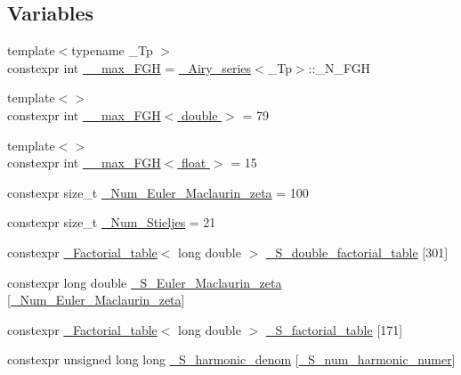 \subsection*{Variables}
\begin{DoxyCompactItemize}
\item 
{\footnotesize template$<$typename \+\_\+\+Tp $>$ }\\constexpr int \hyperlink{namespacestd_1_1____detail_ae3ef7007b55cd83fa162820c809a2995}{\+\_\+\+\_\+max\+\_\+\+F\+GH} = \hyperlink{classstd_1_1____detail_1_1__Airy__series}{\+\_\+\+Airy\+\_\+series}$<$\+\_\+\+Tp$>$\+::\+\_\+\+N\+\_\+\+F\+GH
\item 
{\footnotesize template$<$$>$ }\\constexpr int \hyperlink{namespacestd_1_1____detail_ac945c3d1897eb356e75d379f67367a4b}{\+\_\+\+\_\+max\+\_\+\+F\+G\+H$<$ double $>$} = 79
\item 
{\footnotesize template$<$$>$ }\\constexpr int \hyperlink{namespacestd_1_1____detail_a67195934ce49105fd7b765e669a5a2a0}{\+\_\+\+\_\+max\+\_\+\+F\+G\+H$<$ float $>$} = 15
\item 
constexpr size\+\_\+t \hyperlink{namespacestd_1_1____detail_ab27e687e1052be7a72de187e0dead124}{\+\_\+\+Num\+\_\+\+Euler\+\_\+\+Maclaurin\+\_\+zeta} = 100
\item 
constexpr size\+\_\+t \hyperlink{namespacestd_1_1____detail_ab80ca58ee274bce962adc6208bfe4e2d}{\+\_\+\+Num\+\_\+\+Stieljes} = 21
\item 
constexpr \hyperlink{structstd_1_1____detail_1_1__Factorial__table}{\+\_\+\+Factorial\+\_\+table}$<$ long double $>$ \hyperlink{namespacestd_1_1____detail_a6d1131fefdb30b2746c76ff801bdc833}{\+\_\+\+S\+\_\+double\+\_\+factorial\+\_\+table} \mbox{[}301\mbox{]}
\item 
constexpr long double \hyperlink{namespacestd_1_1____detail_acd941b49595dd03e93c88107ad2f68c2}{\+\_\+\+S\+\_\+\+Euler\+\_\+\+Maclaurin\+\_\+zeta} \mbox{[}\hyperlink{namespacestd_1_1____detail_ab27e687e1052be7a72de187e0dead124}{\+\_\+\+Num\+\_\+\+Euler\+\_\+\+Maclaurin\+\_\+zeta}\mbox{]}
\item 
constexpr \hyperlink{structstd_1_1____detail_1_1__Factorial__table}{\+\_\+\+Factorial\+\_\+table}$<$ long double $>$ \hyperlink{namespacestd_1_1____detail_a008b54abe31c1027aefdfd7a76a40e99}{\+\_\+\+S\+\_\+factorial\+\_\+table} \mbox{[}171\mbox{]}
\item 
constexpr unsigned long long \hyperlink{namespacestd_1_1____detail_ad2bdb66d93fa4433097b287c7899cd1e}{\+\_\+\+S\+\_\+harmonic\+\_\+denom} \mbox{[}\hyperlink{namespacestd_1_1____detail_a554788747841f6abbfd7572673df32ad}{\+\_\+\+S\+\_\+num\+\_\+harmonic\+\_\+numer}\mbox{]}

\end{DoxyCompactItemize}
